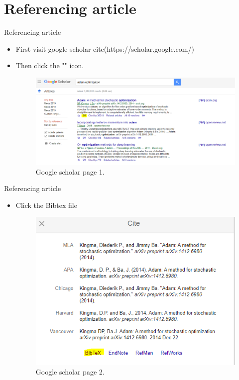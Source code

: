 \documentclass{beamer}
\begin{document}
\section{Referencing article}
\begin{frame}{Referencing article}
  \begin{itemize}
    \item First visit google scholar cite(https://scholar.google.com/)
    \item Then click the "" icon.
    \begin{figure}[h]
    	\centering
    	\includegraphics[scale=0.3]{google_scholar.png}
    	\caption{Google scholar page 1.}
    	\label{fig:fig1}
    \end{figure}
 \end{itemize}
\end{frame}
\begin{frame}{Referencing article}
\begin{itemize}
	\item Click the Bibtex file
	\begin{figure}[h]
		\centering
		\includegraphics[scale=0.4]{google_scholar2.png}
		\caption{Google scholar page 2.}
		\label{fig:fig2}
	\end{figure}
\end{itemize}
\end{frame}
\end{document}
